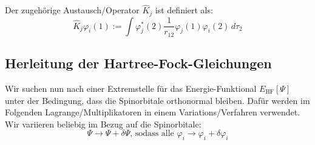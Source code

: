 Der zugehörige Austausch\-/Operator $\hat{K}_j$ ist definiert als:
\begin{equation}
  \hat{K}_j \varphi_i(1) :=
  \int \varphi_j^*(2) \frac{1}{r_{12}} \varphi_j(1) \varphi_i(2) \,d\tau_2
\end{equation}

\cite[S. 206]{lewars_2016} \cite[S. 23]{tc2_3}

\subsection{Herleitung der Hartree-Fock-Gleichungen}
Wir suchen nun nach einer Extremstelle für das Energie-Funktional $E_\textrm{HF}[\Psi]$ unter der Bedingung, 
dass die Spinorbitale orthonormal bleiben. 
Dafür werden im Folgenden Lagrange\-/Multiplikatoren in einem Variations\-/Verfahren verwendet.
Wir variieren beliebig im Bezug auf die Spinorbitale: 
\begin{equation}
\Psi \rightarrow \Psi + \delta \Psi
\text{, sodass alle } \varphi_i \rightarrow \varphi_i + \delta \varphi_i
\end{equation}

